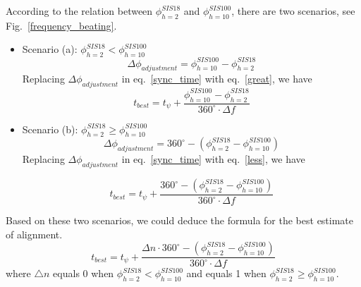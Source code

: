 According to the relation between $\phi_{h=2}^{SIS18}$ and $\phi_{h=10}^{SIS100}$, there are two scenarios, see Fig.~\ref{frequency_beating}.
\begin{itemize}
    \item Scenario (a): $\phi_{h=2}^{SIS18} < \phi_{h=10}^{SIS100}$
	\begin{equation}
	 \Delta \phi_{adjustment} = \phi_{h=10}^{SIS100} - \phi_{h=2}^{SIS18}\label {great}
   \end{equation}
   Replacing $\Delta \phi_{adjustment}$ in eq.~\ref{sync_time} with eq.~\ref{great}, we have
	\begin{equation}
	 t_{best} =t_{\psi} +\frac {\phi_{h=10}^{SIS100} - \phi_{h=2}^{SIS18}}{{360^\circ} \cdot {\Delta f}} \label {beating_win_1}
   \end{equation}
     \item  Scenario (b): $\phi_{h=2}^{SIS18} \ge \phi_{h=10}^{SIS100}$
	\begin{equation}
	 \Delta \phi_{adjustment} = 360^\circ - (\phi_{h=2}^{SIS18}-\phi_{h=10}^{SIS100}) \label {less}
   \end{equation}
  Replacing $\Delta \phi_{adjustment}$ in eq.~\ref{sync_time} with eq.~\ref{less}, we have

	\begin{equation}
	 t_{best} =t_{\psi} +\frac {360^\circ - (\phi_{h=2}^{SIS18}-\phi_{h=10}^{SIS100})}{{360^\circ} \cdot {\Delta f}} \label {beating_win_2}
   \end{equation}
\end{itemize}
Based on these two scenarios, we could deduce the formula for the best estimate of alignment. 
	\begin{equation}
	 t_{best} =t_{\psi} +\frac {{\Delta n} \cdot {360^\circ} - (\phi_{h=2}^{SIS18}-\phi_{h=10}^{SIS100})}{{360^\circ} \cdot {\Delta f}} \label {beating_win_2}
   \end{equation}
where $\bigtriangleup{n}$ equals 0 when  $\phi_{h=2}^{SIS18} < \phi_{h=10}^{SIS100}$ and equals 1 when  $\phi_{h=2}^{SIS18} \ge \phi_{h=10}^{SIS100}$.

